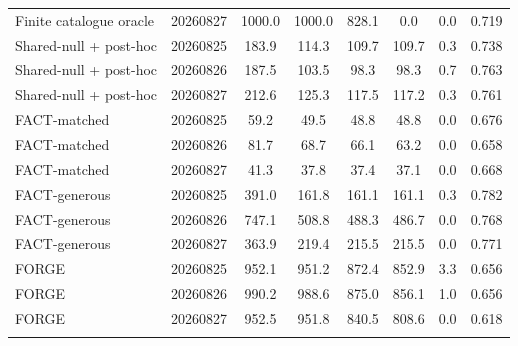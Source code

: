 \documentclass{article}
\theoremstyle{definition}
\begin{document}
\begin{table}[htbp]
{\begin{tabular}{llcccccc}
Finite catalogue oracle & 20260827 & 1000.0 & 1000.0 & 828.1 & 0.0 & 0.0 & 0.719 \\
Shared-null + post-hoc & 20260825 & 183.9 & 114.3 & 109.7 & 109.7 & 0.3 & 0.738 \\
Shared-null + post-hoc & 20260826 & 187.5 & 103.5 & 98.3 & 98.3 & 0.7 & 0.763 \\
Shared-null + post-hoc & 20260827 & 212.6 & 125.3 & 117.5 & 117.2 & 0.3 & 0.761 \\
FACT-matched & 20260825 & 59.2 & 49.5 & 48.8 & 48.8 & 0.0 & 0.676 \\
FACT-matched & 20260826 & 81.7 & 68.7 & 66.1 & 63.2 & 0.0 & 0.658 \\
FACT-matched & 20260827 & 41.3 & 37.8 & 37.4 & 37.1 & 0.0 & 0.668 \\
FACT-generous & 20260825 & 391.0 & 161.8 & 161.1 & 161.1 & 0.3 & 0.782 \\
FACT-generous & 20260826 & 747.1 & 508.8 & 488.3 & 486.7 & 0.0 & 0.768 \\
FACT-generous & 20260827 & 363.9 & 219.4 & 215.5 & 215.5 & 0.0 & 0.771 \\
\cellcolor{forgerow}FORGE &\cellcolor{forgerow} 20260825 &\cellcolor{forgerow} 952.1 &\cellcolor{forgerow} 951.2 &\cellcolor{forgerow} 872.4 &\cellcolor{forgerow} 852.9 &\cellcolor{forgerow} 3.3 &\cellcolor{forgerow} 0.656 \\
\cellcolor{forgerow}FORGE &\cellcolor{forgerow} 20260826 &\cellcolor{forgerow} 990.2 &\cellcolor{forgerow} 988.6 &\cellcolor{forgerow} 875.0 &\cellcolor{forgerow} 856.1 &\cellcolor{forgerow} 1.0 &\cellcolor{forgerow} 0.656 \\
\cellcolor{forgerow}FORGE &\cellcolor{forgerow} 20260827 &\cellcolor{forgerow} 952.5 &\cellcolor{forgerow} 951.8 &\cellcolor{forgerow} 840.5 &\cellcolor{forgerow} 808.6 &\cellcolor{forgerow} 0.0 &\cellcolor{forgerow} 0.618 \\
\relax{}\end{tabular}
}
\end{table}
\end{document}
